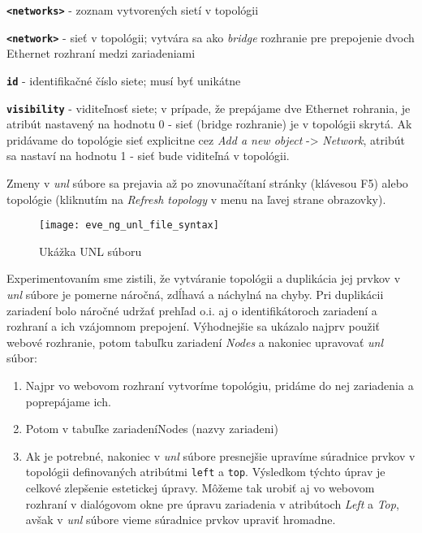 \begin{enumerate}[noitemsep]
\begin{description}[noitemsep]
        \item \textbf{\texttt{<networks>}} - zoznam vytvorených sietí v topológii
        \begin{description}[noitemsep]
            \item \textbf{\texttt{<network>}} - sieť v topológii; vytvára sa ako \emph{bridge} rozhranie pre prepojenie dvoch Ethernet rozhraní medzi zariadeniami
            \begin{description}[noitemsep]
                \item \textbf{\texttt{id}} - identifikačné číslo siete; musí byť unikátne
                \item \textbf{\texttt{visibility}} - viditeľnosť siete; v prípade, že prepájame dve Ethernet rohrania, je atribút nastavený na hodnotu 0 - sieť (bridge rozhranie) je v topológii skrytá. Ak pridávame do topológie sieť explicitne cez \emph{Add a new object} -> \emph{Network}, atribút sa nastaví na hodnotu 1 - sieť bude viditeľná v topológii.
            \end{description}
        \end{description}
    \end{description}

Zmeny v \emph{unl} súbore sa prejavia až po znovunačítaní stránky (klávesou F5) alebo topológie (kliknutím na \emph{Refresh topology} v menu na ľavej strane obrazovky).

\begin{figure}
    \centering
    \texttt{[image: eve\_ng\_unl\_file\_syntax]}
    \caption{Ukážka UNL súboru}
    \label{obr:eve_ng_unl_file_syntax}
\end{figure}
    
Experimentovaním sme zistili, že vytváranie topológii a duplikácia jej prvkov v \emph{unl} súbore je pomerne náročná, zdĺhavá a náchylná na chyby. Pri duplikácii zariadení bolo náročné udržať prehľad o.i. aj o identifikátoroch zariadení a rozhraní a ich vzájomnom prepojení. Výhodnejšie sa ukázalo najprv použiť webové rozhranie, potom tabuľku zariadení \emph{Nodes} a nakoniec upravovať \emph{unl} súbor:
    
    \begin{enumerate}[noitemsep]
        \item Najpr vo webovom rozhraní vytvoríme topológiu, pridáme do nej zariadenia a poprepájame ich.
        \item Potom v tabuľke zariadeníNodes (nazvy zariadeni)
        \item Ak je potrebné, nakoniec v \emph{unl} súbore presnejšie upravíme súradnice prvkov v topológii definovaných atribútmi \texttt{left} a \texttt{top}. Výsledkom týchto úprav je celkové zlepšenie estetickej úpravy. Môžeme tak urobiť aj vo webovom rozhraní v dialógovom okne pre úpravu zariadenia v atribútoch \emph{Left} a \emph{Top}, avšak v \emph{unl} súbore vieme súradnice prvkov upraviť hromadne.
    \end{enumerate}
    

\end{enumerate}
